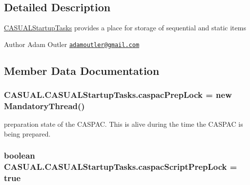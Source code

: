 \subsection{Detailed Description}
\hyperlink{class_c_a_s_u_a_l_1_1_c_a_s_u_a_l_startup_tasks}{C\-A\-S\-U\-A\-L\-Startup\-Tasks} provides a place for storage of sequential and static items

\begin{DoxyAuthor}{Author}
Adam Outler \href{mailto:adamoutler@gmail.com}{\tt adamoutler@gmail.\-com} 
\end{DoxyAuthor}


\subsection{Member Data Documentation}
\hypertarget{class_c_a_s_u_a_l_1_1_c_a_s_u_a_l_startup_tasks_a782be3fd7088ec9d40f2981113948c5e}{
\subsubsection[{caspac\-Prep\-Lock}]{ C\-A\-S\-U\-A\-L.\-C\-A\-S\-U\-A\-L\-Startup\-Tasks.\-caspac\-Prep\-Lock = new {\bf Mandatory\-Thread}()\hspace{0.3cm}{\ttfamily [static]}}}\label{class_c_a_s_u_a_l_1_1_c_a_s_u_a_l_startup_tasks_a782be3fd7088ec9d40f2981113948c5e}
preparation state of the C\-A\-S\-P\-A\-C. This is alive during the time the C\-A\-S\-P\-A\-C is being prepared. \hypertarget{class_c_a_s_u_a_l_1_1_c_a_s_u_a_l_startup_tasks_a31fcc3f44d4aad9e291561ab7dc4549b}{
\subsubsection[{caspac\-Script\-Prep\-Lock}]{\setlength{\rightskip}{0pt plus 5cm}boolean C\-A\-S\-U\-A\-L.\-C\-A\-S\-U\-A\-L\-Startup\-Tasks.\-caspac\-Script\-Prep\-Lock = true\hspace{0.3cm}{\ttfamily [static]}}}\label{class_c_a_s_u_a_l_1_1_c_a_s_u_a_l_startup_tasks_a31fcc3f44d4aad9e291561ab7dc4549b}
